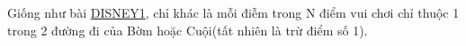 Giống như bài \href{http://vnoi.info/problems/show/DISNEY1/}{DISNEY1}, chỉ khác là mỗi điễm trong N điểm vui chơi chỉ thuộc 1 trong 2 đường đi của Bờm hoặc Cuội(tất nhiên là trừ điểm số 1).